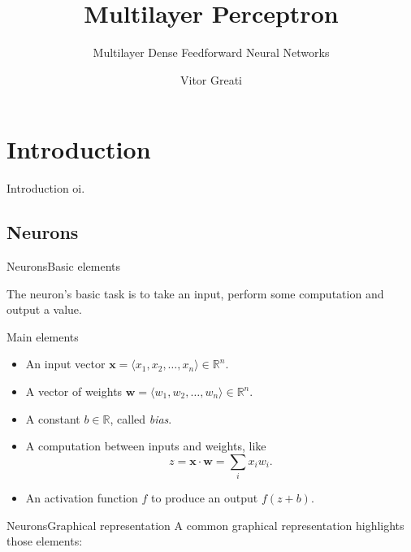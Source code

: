 \documentclass{beamer}
\title{Multilayer Perceptron}
\subtitle{Multilayer Dense Feedforward Neural Networks}
\author{Vitor Greati\inst{1}}
\institute[]
{
	\inst{1}%
	Federal University of Rio Grande do Norte
}
\date{}
\begin{document}
\frame{\titlepage}

\section{Introduction}

    \begin{frame}{Introduction}
        oi.
    \end{frame}

    \subsection{Neurons}


    \begin{frame}{Neurons}{Basic elements}

        The neuron's basic task is to take an input, perform some computation and
        output a value.

        \begin{block}{Main elements}
            \begin{itemize}
                \item An input vector $\mathbf{x} = \langle x_1, x_2, \ldots, x_n \rangle \in \mathbb{R}^n$.
                \item A vector of weights $\mathbf{w} = \langle w_1, w_2, \ldots, w_n \rangle \in \mathbb{R}^n$.
                \item A constant $b \in \mathbb{R}$, called \emph{bias}.
                \item A computation between inputs and weights, like 
                    $$z=\mathbf{x}\cdot\mathbf{w} =\sum_i x_iw_i.$$
                \item An activation function $f$ to produce an output $f(z + b)$.
            \end{itemize}
        \end{block}
    \end{frame}

    \begin{frame}{Neurons}{Graphical representation}
        A common graphical representation highlights those elements:
        \begin{figure}
            \centering
        \end{figure}
    \end{frame}
\end{document}

